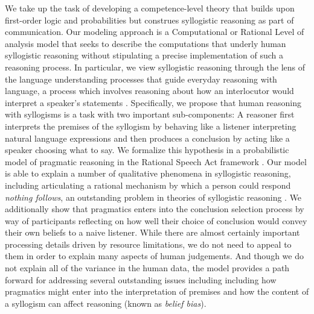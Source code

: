 \documentclass[floatsintext, doc]{apa6}
\newcommand{\mht}[1]{{\textcolor{Blue}{[mht: #1]}}}
\begin{document}
We take up the task of developing a competence-level theory that builds upon first-order logic and probabilities but construes syllogistic reasoning as part of communication. 
Our modeling approach is a Computational or Rational Level of analysis model \cite{marr1982vision, anderson1990adaptive} that seeks to describe the computations that underly human syllogistic reasoning without stipulating a precise implementation of such a reasoning process. 
In particular, we view syllogistic reasoning through the lens of the language understanding processes that guide everyday reasoning with language, a process which involves reasoning about how an interlocutor would interpret a speaker's statements \cite{Grice1975, Clark1996, Levinson2000}. 
Specifically, we propose that human reasoning with syllogisms is a task with two important sub-components: A reasoner first interprets the premises of the syllogism by behaving like a listener interpreting natural language expressions and then produces a conclusion by acting like a speaker choosing what to say.
We formalize this hypothesis in a probabilistic model of pragmatic reasoning in the Rational Speech Act framework \cite{Frank2012a, goodman2016pragmatic}.
Our model is able to explain a number of qualitative phenomena in syllogistic reasoning, including articulating a rational mechanism by which a person could respond \emph{nothing follows}, an outstanding problem in theories of syllogistic reasoning \cite{riesterer2020modeling}.
We additionally show that pragmatics enters into the conclusion selection process by way of participants reflecting on how well their choice of conclusion would convey their own beliefs to a naive listener. 
While there are almost certainly important processing details driven by resource limitations, we do not need to appeal to them in order to explain many aspects of human judgements.
And though we do not explain all of the variance in the human data, the model provides a path forward for addressing several outstanding issues including including how pragmatics might enter into the interpretation of premises and  how the content of a syllogism can affect reasoning (known as \emph{belief bias}).
\end{document}
